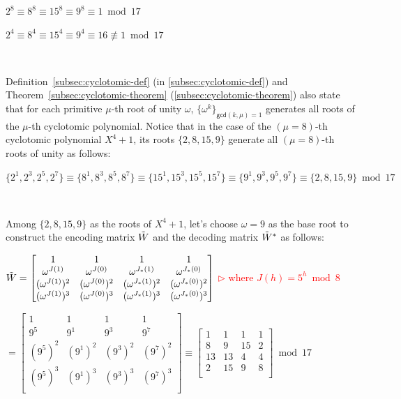 $2^8 \equiv 8^8 \equiv 15^8 \equiv 9^8 \equiv 1 \bmod 17$

$2^4 \equiv 8^4 \equiv 15^4 \equiv 9^4 \equiv 16 \not\equiv 1 \bmod 17$

$ $

Definition~\ref*{subsec:cyclotomic-def} (in \autoref{subsec:cyclotomic-def}) and Theorem~\ref*{subsec:cyclotomic-theorem} (\autoref{subsec:cyclotomic-theorem}) also state that for each primitive $\mu$-th root of unity $\omega$, $\{\omega^k\}_{\textsf{gcd}(k, \mu) = 1}$ generates all roots of the $\mu$-th cyclotomic polynomial. Notice that in the case of the $(\mu=8)$-th cyclotomic polynomial $X^4 + 1$, its roots $\{2, 8, 15, 9\}$ generate all $(\mu=8)$-th roots of unity as follows:

$\{2^1, 2^3, 2^5, 2^7\} \equiv \{8^1, 8^3, 8^5, 8^7\} \equiv \{15^1, 15^3, 15^5, 15^7\} \equiv \{9^1, 9^3, 9^5, 9^7\} \equiv \{2, 8, 15, 9\} \bmod 17$

$ $

Among $\{2, 8, 15, 9\}$ as the roots of $X^4 + 1$, let's choose $\omega = 9$ as the base root to construct the encoding matrix $\tilde{W}$ and the decoding matrix $\tilde{W}^*$ as follows: 

$\tilde{W} = \begin{bmatrix}
1 & 1 & 1 & 1\\
\omega^{J(1)} & \omega^{J(0)} & \omega^{J_*(1)} & \omega^{J_*(0)}\\
(\omega^{J(1)})^2 & (\omega^{J(0)})^2 & (\omega^{J_*(1)})^2 & (\omega^{J_*(0)})^2\\
(\omega^{J(1)})^3 & (\omega^{J(0)})^3 & (\omega^{J_*(1)})^3 & (\omega^{J_*(0)})^3\\
\end{bmatrix}$ \textcolor{red}{  $\rhd$ where $J(h) = 5^h \bmod 8$}

$ = \begin{bmatrix}
1 & 1 & 1 & 1\\
9^{5} & 9^{1} & 9^{3} & 9^{7}\\
(9^{5})^2 & (9^{1})^2 & (9^{3})^2 & (9^{7})^2\\
(9^{5})^3 & (9^{1})^3 & (9^{3})^3 & (9^{7})^3\\
\end{bmatrix} \equiv \begin{bmatrix}
1 & 1 & 1 & 1\\
8 & 9 & 15 & 2\\
13 & 13 & 4 & 4\\
2 & 15 & 9 & 8\\
\end{bmatrix} \bmod{17}$ 

